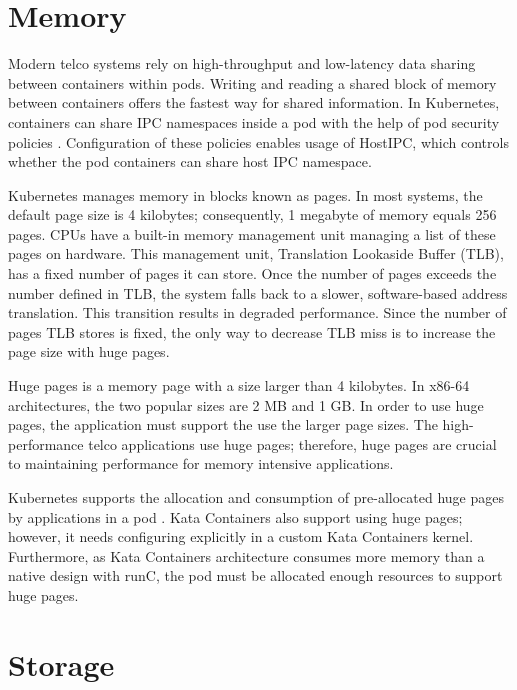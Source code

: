 \section{Memory}

Modern telco systems rely on high-throughput and low-latency data sharing between containers within pods. Writing and reading a shared block of memory between containers offers the fastest way for shared information. In Kubernetes, containers can share IPC namespaces inside a pod with the help of pod security policies \cite{PodSecurityPolicyKubernetes}. Configuration of these policies enables usage of HostIPC, which controls whether the pod containers can share host IPC namespace.

Kubernetes manages memory in blocks known as pages. In most systems, the default page size is 4 kilobytes; consequently, 1 megabyte of memory equals 256 pages. CPUs have a built-in memory management unit managing a list of these pages on hardware. This management unit, Translation Lookaside Buffer (TLB), has a fixed number of pages it can store. Once the number of pages exceeds the number defined in TLB, the system falls back to a slower, software-based address translation. This transition results in degraded performance. Since the number of pages TLB stores is fixed, the only way to decrease TLB miss is to increase the page size with huge pages. \cite{HugePagesOpenShift}

Huge pages is a memory page with a size larger than 4 kilobytes. In x86-64 architectures, the two popular sizes are 2 MB and 1 GB. In order to use huge pages, the application must support the use the larger page sizes. The high-performance telco applications use huge pages; therefore, huge pages are crucial to maintaining performance for memory intensive applications.

Kubernetes supports the allocation and consumption of pre-allocated huge pages by applications in a pod \cite{HugePagesKubernetes}. Kata Containers also support using huge pages; however, it needs configuring explicitly in a custom Kata Containers kernel. Furthermore, as Kata Containers architecture consumes more memory than a native design with runC, the pod must be allocated enough resources to support huge pages.

\section{Storage}

